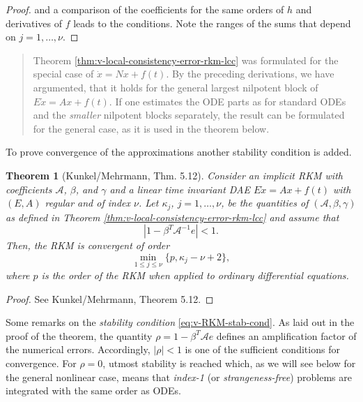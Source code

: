 \documentclass[]{book}
\newenvironment {JHSAYS} [0] {\begin{quote}\color{jhsc}} {\end{quote}}
\newtheorem{theorem}{Theorem}[chapter]
\theoremstyle{definition}
\theoremstyle{definition}
\theoremstyle{definition}
\theoremstyle{definition}
\theoremstyle{remark}
\begin{document}
\begin{proof}
and a comparison of the coefficients for the same orders of \(h\) and derivatives of \(f\) leads to the conditions.
Note the ranges of the sums that depend on \(j=1, \dots, \nu\).
\end{proof}

\begin{JHSAYS}
Theorem \ref{thm:v-local-consistency-error-rkm-lcc} was formulated for the special case of \(\dot x = Nx +f(t)\). By the preceding derivations, we have argumented, that it holds for the general largest nilpotent block of \(E\dot x = Ax+f(t)\). If one estimates the ODE parts as for standard ODEs and the \emph{smaller} nilpotent blocks separately, the result can be formulated for the general case, as it is used in the theorem below.
\end{JHSAYS}

To prove convergence of the approximations another stability condition is added.

\begin{theorem}[Kunkel/Mehrmann, Thm. 5.12]
\protect\hypertarget{thm:v-convergence-RKM-LTI}{}{\label{thm:v-convergence-RKM-LTI} {} }Consider an implicit RKM with coefficients \(\mathcal A\), \(\beta\), and \(\gamma\) and a linear time invariant DAE \(E\dot x = Ax+f(t)\) with \((E,A)\) regular and of index \(\nu\). Let \(\kappa_j\), \(j=1,\dots,\nu\), be the quantities of \((\mathcal A,\beta, \gamma)\) as defined in Theorem \ref{thm:v-local-consistency-error-rkm-lcc} and assume that
\begin{equation}
| 1-\beta ^T\mathcal A^{-1}e| < 1. \label{eq:v-RKM-stab-cond}
\end{equation}
Then, the RKM is convergent of order
\begin{equation}
\min_{1\leq j \leq \nu}\{p, \kappa_j - \nu +2\},
\end{equation}
where \(p\) is the order of the RKM when applied to ordinary differential equations.
\end{theorem}

\begin{proof}
{}See Kunkel/Mehrmann, Theorem 5.12.
\end{proof}

Some remarks on the \emph{stability condition} \eqref{eq:v-RKM-stab-cond}. As laid out in the proof of the theorem, the quantity \(\rho = 1-\beta ^T\mathcal Ae\) defines an amplification factor of the numerical errors. Accordingly, \(|\rho| < 1\) is one of the sufficient conditions for convergence. For \(\rho = 0\), utmost stability is reached which, as we will see below for the general nonlinear case, means that \emph{index-1} (or \emph{strangeness-free}) problems are integrated with the same order as ODEs.
\end{document}
